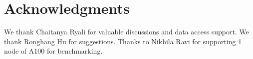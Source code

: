 \section{Acknowledgments}
We thank Chaitanya Ryali for valuable discussions and data access support. We thank Ronghang Hu for suggestions. Thanks to Nikhila Ravi for supporting 1 node of A100 for benchmarking. 